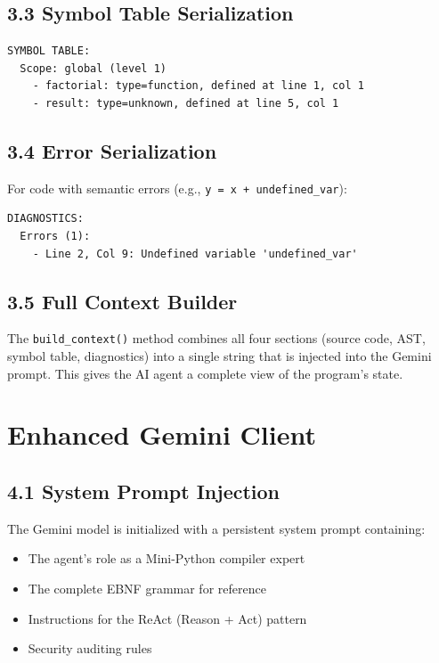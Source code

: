 \documentclass[a4paper,11pt]{article}
\begin{document}
    \subsection{3.3 Symbol Table Serialization}

    \begin{verbatim}
SYMBOL TABLE:
  Scope: global (level 1)
    - factorial: type=function, defined at line 1, col 1
    - result: type=unknown, defined at line 5, col 1
    \end{verbatim}

    \subsection{3.4 Error Serialization}

    For code with semantic errors (e.g., \texttt{y = x + undefined\_var}):

    \begin{verbatim}
DIAGNOSTICS:
  Errors (1):
    - Line 2, Col 9: Undefined variable 'undefined_var'
    \end{verbatim}

    \subsection{3.5 Full Context Builder}

    The \texttt{build\_context()} method combines all four sections (source code, AST, symbol table, diagnostics) into a single string that is injected into the Gemini prompt. This gives the AI agent a complete view of the program's state.

    \section{Enhanced Gemini Client}

    \subsection{4.1 System Prompt Injection}

    The Gemini model is initialized with a persistent system prompt containing:
    \begin{itemize}
        \item The agent's role as a Mini-Python compiler expert
        \item The complete EBNF grammar for reference
        \item Instructions for the ReAct (Reason + Act) pattern
        \item Security auditing rules
    \end{itemize}
\end{document}
